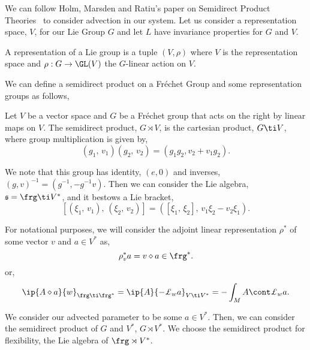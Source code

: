 \noindent
We can follow Holm, Marsden and Ratiu's paper on Semidirect Product Theories~\cite{holm1998eulerpoincare} to consider advection in our system. Let us consider a representation space, $V$, for our Lie Group $G$ and let $L$ have invariance properties for $G$ and $V$.
\begin{ndefi}[Representation]
  A representation of a Lie group is a tuple $(V, \rho)$ where $V$ is the representation space and $\rho : G \to \GL(V)$ the $G$-linear action on $V$.
\end{ndefi}
\noindent
We can define a semidirect product on a Fr\'echet Group and some representation groups as follows,
\begin{ndefi}
  Let $V$ be a vector space and $G$ be a Fr\'echet group that acts on the right by linear maps on $V$. The semidirect product, $G \rtimes V$, is the cartesian product, $G \ti V$, where group multiplication is given by,
  $$ (g_1,\, v_1)(g_2,\, v_2) = (g_1g_2, v_2 + v_1g_2). $$
\end{ndefi}
\noindent
We note that this group has identity, $(e, 0)$ and inverses, $(g, v)^{-1} = (g^{-1}, -g^{-1}v)$. Then we can consider the Lie algebra, $\mathfrak{s} = \frg \ti V^*$, and it bestows a Lie bracket,
$$ [(\xi_1,\, v_1),\, (\xi_2,\, v_2)] = ([\xi_1,\,\xi_2],\, v_1\xi_2 - v_2\xi_1). $$
\begin{notation}
   For notational purposes, we will consider the adjoint linear representation $\rho^*$ of some vector $v$ and $a \in V^*$ as,
   $$ \rho^*_v a = v \diamond a \in \frg^*. $$
   or,
   $$ \ip{A \diamond a}{w}_{\frg \ti \frg^*} = \ip{A}{-\pounds_w a}_{V\ti V^*} = -\int_M A \cont \pounds_w a.  $$
\end{notation}

\noindent
We consider our advected parameter to be some $a \in V^*$. Then, we can consider the semidirect product of $G$ and $V^*$, $G \rtimes V^*$. We choose the semidirect product for flexibility, the Lie algebra of $\frg \rtimes V^*$. \\

